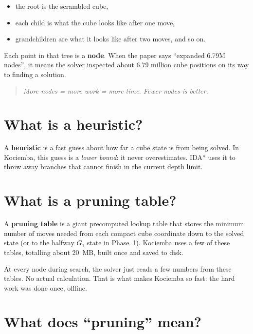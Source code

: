 \documentclass[11pt,a4paper]{article}
\newcommand{\defn}[1]{\textbf{#1}}
\newcommand{\qbox}[1]{\begin{quote}\small\textit{#1}\end{quote}}
\begin{document}
\begin{itemize}[leftmargin=2em]
  \item the root is the scrambled cube,
  \item each child is what the cube looks like after one move,
  \item grandchildren are what it looks like after two moves, and so on.
\end{itemize}

Each point in that tree is a \defn{node}. When the paper says
``expanded 6.79M nodes'', it means the solver inspected about 6.79
million cube positions on its way to finding a solution.

\qbox{More nodes = more work = more time. Fewer nodes is better.}

\section{What is a heuristic?}
\label{sec:heuristic}

A \defn{heuristic} is a fast guess about how far a cube state is from
being solved. In Kociemba, this guess is a \emph{lower bound}: it never
overestimates. IDA* uses it to throw away branches that cannot finish in
the current depth limit.

\section{What is a pruning table?}

A \defn{pruning table} is a giant precomputed lookup table that stores
the minimum number of moves needed from each compact cube coordinate
down to the solved state (or to the halfway $G_1$ state in Phase~1).
Kociemba uses a few of these tables, totalling about 20~MB, built once
and saved to disk.

At every node during search, the solver just reads a few numbers from
these tables. No actual calculation. That is what makes Kociemba so
fast: the hard work was done once, offline.

\section{What does ``pruning'' mean?}
\end{document}

